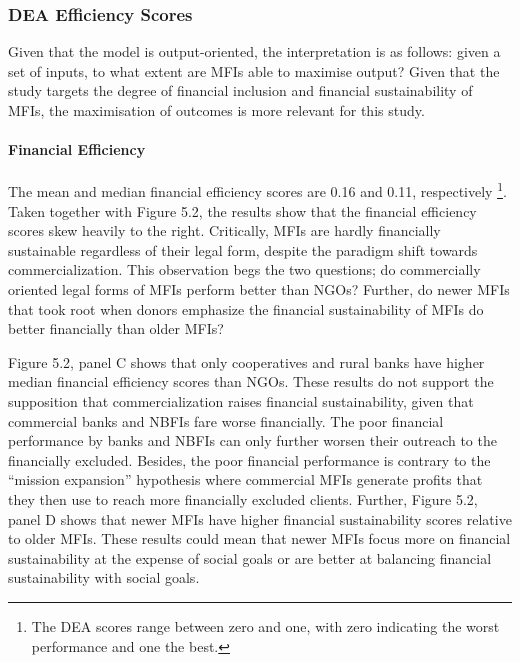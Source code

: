 \documentclass[a4paper, nobind]{templates/ociamthesis}
\begin{document}
\hypertarget{dea-efficiency-scores}{%
\subsubsection{DEA Efficiency Scores}\label{dea-efficiency-scores}}

Given that the model is output-oriented, the interpretation is as follows: given a set of inputs, to what extent are MFIs able to maximise output? Given that the study targets the degree of financial inclusion and financial sustainability of MFIs, the maximisation of outcomes is more relevant for this study.

\hypertarget{financial-efficiency}{%
\paragraph{Financial Efficiency}\label{financial-efficiency}}

The mean and median financial efficiency scores are 0.16 and 0.11, respectively \footnote{The DEA scores range between zero and one, with zero indicating the worst performance and one the best.}. Taken together with Figure 5.2, the results show that the financial efficiency scores skew heavily to the right. Critically, MFIs are hardly financially sustainable regardless of their legal form, despite the paradigm shift towards commercialization. This observation begs the two questions; do commercially oriented legal forms of MFIs perform better than NGOs? Further, do newer MFIs that took root when donors emphasize the financial sustainability of MFIs do better financially than older MFIs?

Figure 5.2, panel C shows that only cooperatives and rural banks have higher median financial efficiency scores than NGOs. These results do not support the supposition that commercialization raises financial sustainability, given that commercial banks and NBFIs fare worse financially. The poor financial performance by banks and NBFIs can only further worsen their outreach to the financially excluded. Besides, the poor financial performance is contrary to the ``mission expansion'' hypothesis where commercial MFIs generate profits that they then use to reach more financially excluded clients. Further, Figure 5.2, panel D shows that newer MFIs have higher financial sustainability scores relative to older MFIs. These results could mean that newer MFIs focus more on financial sustainability at the expense of social goals or are better at balancing financial sustainability with social goals.
\end{document}
